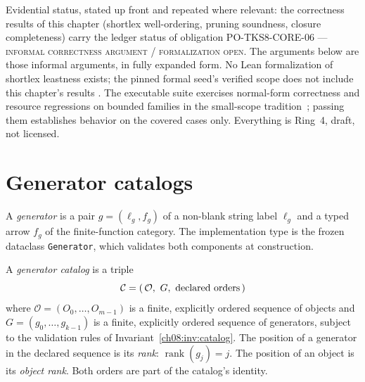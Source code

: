 Evidential status, stated up front and repeated where relevant: the
correctness results of this chapter (shortlex well-ordering, pruning
soundness, closure completeness) carry the ledger status of obligation
PO-TKS8-CORE-06 --- \textsc{informal correctness argument / formalization
open}. The arguments below are those informal arguments, in fully expanded
form. No Lean formalization of shortlex leastness exists; the pinned formal
seed's verified scope does not include this chapter's results
\cite{lean4}. The executable suite exercises normal-form correctness and
resource regressions on bounded families in the small-scope
tradition~\cite{jackson}; passing them establishes behavior on the covered
cases only. Everything is Ring~4, draft, not licensed.

\section{Generator catalogs}\label{ch08:sec:catalogs}

\begin{definition}[Generator]\label{ch08:def:generator}
A \emph{generator} is a pair $g=(\ell_g, f_g)$ of a non-blank string label
$\ell_g$ and a typed arrow $f_g$ of the finite-function category. The
implementation type is the frozen dataclass \texttt{Generator}, which
validates both components at construction.
\end{definition}

\begin{definition}[Catalog]\label{ch08:def:catalog}
A \emph{generator catalog} is a triple
\[
\mathcal{C}=(\,\mathcal{O},\ G,\ \text{declared orders}\,)
\]
where $\mathcal{O}=(O_0,\dots,O_{m-1})$ is a finite, explicitly ordered
sequence of objects and $G=(g_0,\dots,g_{k-1})$ is a finite, explicitly
ordered sequence of generators, subject to the validation rules of
Invariant~\ref{ch08:inv:catalog}. The position of a generator in the
declared sequence is its \emph{rank}: $\operatorname{rank}(g_j)=j$. The
position of an object is its \emph{object rank}. Both orders are part of the
catalog's identity.
\end{definition}

